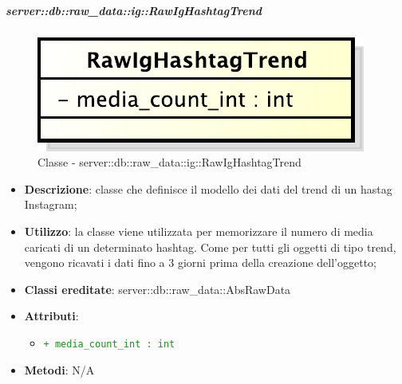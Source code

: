 		\subparagraph{server::db::raw\_data::ig::RawIgHashtagTrend} %
		\label{subp:server_db_raw_data_ig_rawighashtagtrend}
			\begin{figure}[htbp]
				\centering
				\centerline{\includegraphics[scale=0.75]{./images/server/classes/db/raw_ig_hashtag_trend.pdf}}
				\caption{Classe - server::db::raw\_data::ig::RawIgHashtagTrend}
			\end{figure}
			\begin{itemize}
				\item \textbf{Descrizione}: classe che definisce il modello dei dati del trend di un hastag Instagram;
				\item \textbf{Utilizzo}: la classe viene utilizzata per memorizzare il numero di media caricati di un determinato hashtag. Come per tutti gli oggetti di tipo trend, vengono ricavati i dati fino a 3 giorni prima della creazione dell'oggetto;
				\item \textbf{Classi ereditate}: server::db::raw\_data::AbsRawData
				\item \textbf{Attributi}:
					\begin{itemize}
						\item \textcolor{forestgreen}{\texttt{+ media\_count\_int : int}}
					\end{itemize}
				\item \textbf{Metodi}: N/A
			\end{itemize}



